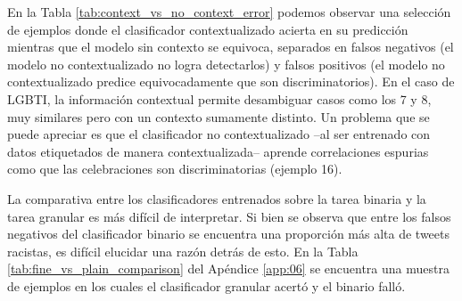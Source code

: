 En la Tabla \ref{tab:context_vs_no_context_error} podemos observar una selección de ejemplos donde el clasificador contextualizado acierta en su predicción mientras que el modelo sin contexto se equivoca, separados en falsos negativos (el modelo no contextualizado no logra detectarlos) y falsos positivos (el modelo no contextualizado predice equivocadamente que son discriminatorios). En el caso de LGBTI, la información contextual permite desambiguar casos como los 7 y 8, muy similares pero con un contexto sumamente distinto. Un problema que se puede apreciar es que el clasificador no contextualizado --al ser entrenado con datos etiquetados de manera contextualizada-- aprende correlaciones espurias como que las celebraciones son discriminatorias (ejemplo 16).

La comparativa entre los clasificadores entrenados sobre la tarea binaria y la tarea granular es más difícil de interpretar. Si bien se observa que entre los falsos negativos del clasificador binario se encuentra una proporción más alta de tweets racistas, es difícil elucidar una razón detrás de esto. En la Tabla \ref{tab:fine_vs_plain_comparison} del Apéndice \ref{app:06} se encuentra una muestra de ejemplos en los cuales el clasificador granular acertó y el binario falló.
